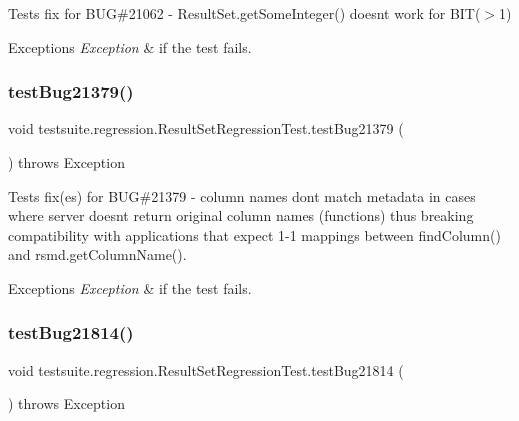 Tests fix for B\+UG\#21062 -\/ Result\+Set.\+get\+Some\+Integer() doesn\textquotesingle{}t work for B\+I\+T($>$1)


\begin{DoxyExceptions}{Exceptions}
{\em Exception} & if the test fails. \\
\hline
\end{DoxyExceptions}
\mbox{\label{classtestsuite_1_1regression_1_1_result_set_regression_test_a0e70ddab19727d4cb909e12706e43cff}} 
\subsubsection{\texorpdfstring{test\+Bug21379()}{testBug21379()}}
{\footnotesize\ttfamily void testsuite.\+regression.\+Result\+Set\+Regression\+Test.\+test\+Bug21379 (\begin{DoxyParamCaption}{ }\end{DoxyParamCaption}) throws Exception}

Tests fix(es) for B\+UG\#21379 -\/ column names don\textquotesingle{}t match metadata in cases where server doesn\textquotesingle{}t return original column names (functions) thus breaking compatibility with applications that expect 1-\/1 mappings between find\+Column() and rsmd.\+get\+Column\+Name().


\begin{DoxyExceptions}{Exceptions}
{\em Exception} & if the test fails. \\
\hline
\end{DoxyExceptions}
\mbox{\label{classtestsuite_1_1regression_1_1_result_set_regression_test_a13c63c3fff5de437e9d908260d7edff8}} 
\subsubsection{\texorpdfstring{test\+Bug21814()}{testBug21814()}}
{\footnotesize\ttfamily void testsuite.\+regression.\+Result\+Set\+Regression\+Test.\+test\+Bug21814 (\begin{DoxyParamCaption}{ }\end{DoxyParamCaption}) throws Exception}


